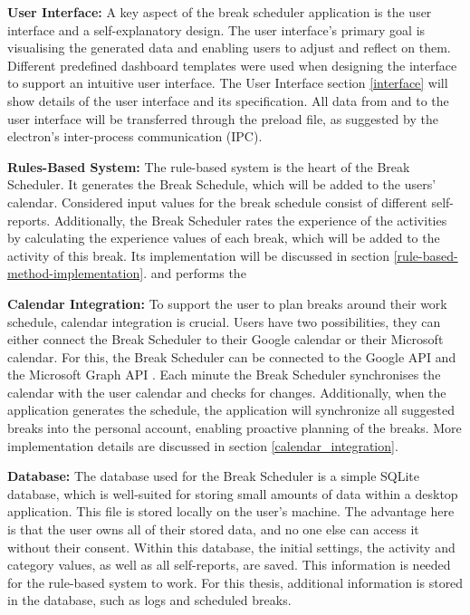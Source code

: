 \documentclass{hasel_thesis}
\begin{document}
\textbf{User Interface:} A key aspect of the break scheduler application is the user interface and a self-explanatory design. The user interface's primary goal is visualising the generated data and enabling users to adjust and reflect on them. Different predefined dashboard templates were used when designing the interface to support an intuitive user interface. The User Interface section \ref{interface} will show details of the user interface and its specification. All data from and to the user interface will be transferred through the preload file, as suggested by the electron's inter-process communication (IPC).


\textbf{Rules-Based System:} The rule-based system is the heart of the Break Scheduler. It generates the Break Schedule, which will be added to the users' calendar. Considered input values for the break schedule consist of different self-reports. Additionally, the Break Scheduler rates the experience of the activities by calculating the experience values of each break, which will be added to the activity of this break. Its implementation will be discussed in section \ref{rule-based-method-implementation}.  and performs the 


\textbf{Calendar Integration:} To support the user to plan breaks around their work schedule, calendar integration is crucial. Users have two possibilities, they can either connect the Break Scheduler to their Google calendar or their Microsoft calendar. For this, the Break Scheduler can be connected to the Google API \cite{googleAPI} and the Microsoft Graph API \cite{graphAPI}. Each minute the Break Scheduler synchronises the calendar with the user calendar and checks for changes. Additionally, when the application generates the schedule, the application will synchronize all suggested breaks into the personal account, enabling proactive planning of the breaks. More implementation details are discussed in section \ref{calendar_integration}.


\textbf{Database:} The database used for the Break Scheduler is a simple SQLite database, which is well-suited for storing small amounts of data within a desktop application. This file is stored locally on the user's machine. The advantage here is that the user owns all of their stored data, and no one else can access it without their consent. Within this database, the initial settings, the activity and category values, as well as all self-reports, are saved. This information is needed for the rule-based system to work. For this thesis, additional information is stored in the database, such as logs and scheduled breaks.
\end{document}
